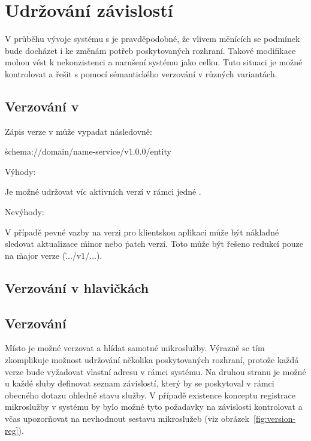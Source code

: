 \section{Udržování závislostí}\label{sec:msa-dependencies}

V průběhu vývoje systému s  je pravděpodobné, že vlivem měnících se podmínek bude docházet i ke změnám potřeb poskytovaných rozhraní.
Takové modifikace mohou vést k nekonzistenci a narušení systému jako celku.
Tuto situaci je možné kontrolovat a řešit s pomocí sémantického verzování v různých variantách.


\subsection{Verzování v }\label{subsec:msa-dependencies-uri}

Zápis verze v  může vypadat následovně:

\h{schema://domain/name-service/v1.0.0/entity}

Výhody:
\begin{ul}
   \item Je možné udržovat víc aktivních  verzí v rámci jedné .
   \item
\end{ul}

Nevýhody:
\begin{ul}
   \item V případě pevné vazby na verzi pro klientskou aplikaci může být nákladné sledovat aktualizace \h{minor} nebo \h{patch} verzí.
   Toto může být řešeno redukcí pouze na \h{major} verze (\h{.../v1/...}).
\end{ul}


\subsection{Verzování v hlavičkách }\label{subsec:msa-dependencies-headers}



\subsection{Verzování }\label{subsec:msa-dependencies-msa}
Místo  je možné verzovat a hlídat samotné mikroslužby.
Výrazně se tím zkomplikuje možnost udržování několika poskytovaných rozhraní, protože každá verze bude vyžadovat vlastní adresu v rámci systému.
Na druhou stranu je možné u každé sluby definovat seznam závislostí, který by se poskytoval v rámci obecného dotazu ohledně stavu služby.
V případě existence konceptu registrace mikroslužby v systému by bylo možné tyto požadavky na závislosti kontrolovat a včas upozorňovat na nevhodnout sestavu mikroslužeb (viz obrázek~\ref{fig:version-reg}).


